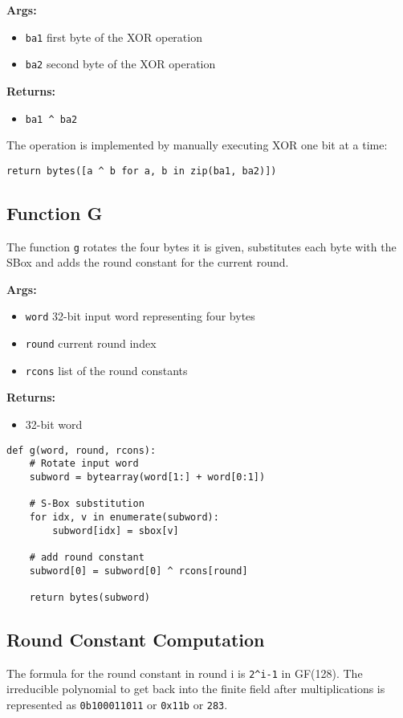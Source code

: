 \textbf{Args:}
\begin{itemize}
  \item \lstinline{ba1} first byte of the XOR operation
  \item \lstinline{ba2} second byte of the XOR operation
\end{itemize}

\textbf{Returns:}
\begin{itemize}
  \item \lstinline{ba1 ^ ba2}
\end{itemize}

The operation is implemented by manually executing XOR one bit at a time:
\begin{lstlisting}
return bytes([a ^ b for a, b in zip(ba1, ba2)])
\end{lstlisting}


\subsection{Function G}
\label{ch:func_g}

The function \lstinline{g} rotates the four bytes it is given, substitutes each byte with the SBox and adds the round constant for the current round.

\textbf{Args:}
\begin{itemize}
  \item \lstinline{word} 32-bit input word representing four bytes
  \item \lstinline{round} current round index
  \item \lstinline{rcons} list of the round constants
\end{itemize}

\textbf{Returns:}
\begin{itemize}
  \item 32-bit word
\end{itemize}

\begin{lstlisting}
def g(word, round, rcons):
    # Rotate input word
    subword = bytearray(word[1:] + word[0:1])

    # S-Box substitution
    for idx, v in enumerate(subword):
        subword[idx] = sbox[v]

    # add round constant
    subword[0] = subword[0] ^ rcons[round]

    return bytes(subword)
\end{lstlisting}


\subsection{Round Constant Computation}
The formula for the round constant in round i is  \lstinline{2^i-1} in GF(128). The irreducible polynomial to get back into the finite field after multiplications is represented as  \lstinline{0b100011011} or  \lstinline{0x11b} or  \lstinline{283}.

